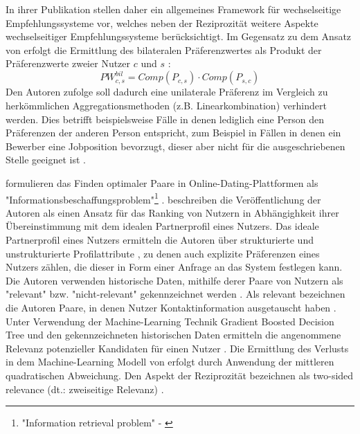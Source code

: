 In ihrer Publikation stellen \textcite[S. 38]{li:inproceedings} daher ein allgemeines Framework für wechselseitige Empfehlungssysteme vor, welches neben der Reziprozität weitere Aspekte wechselseitiger Empfehlungssysteme berücksichtigt.
Im Gegensatz zu dem Ansatz von \textcite[S. 207ff.]{pizzato:2010} erfolgt die Ermittlung des bilateralen Präferenzwertes als Produkt der Präferenzwerte zweier Nutzer $c$ und $s$ \cite[S. 710]{kumari:article}:
\begin{equation}\label{eq40}
    PW_{c,s}^{bil} = Comp(P_{c,s}) \cdot Comp(P_{s,c})
\end{equation}
Den Autoren zufolge soll dadurch eine unilaterale Präferenz im Vergleich zu herkömmlichen Aggregationsmethoden (z.B. Linearkombination) verhindert werden.
Dies betrifft beispielsweise Fälle in denen lediglich eine Person den Präferenzen der anderen Person entspricht, zum Beispiel in Fällen in denen ein Bewerber eine Jobposition bevorzugt, dieser aber nicht für die ausgeschriebenen Stelle geeignet ist \cite[S. 38]{li:inproceedings}.

\textcite[S. 66ff.]{diaz:inproceedings} formulieren das Finden optimaler Paare in Online-Dating-Plattformen als "Informationsbeschaffungsproblem"\footnote{"Information retrieval problem" - \textcite[S. 67]{diaz:inproceedings}} \cite[S. 550]{koprinska:inbook}.
\textcite[S. 550]{koprinska:inbook} beschreiben die Veröffentlichung der Autoren als einen Ansatz für das Ranking von Nutzern in Abhängighkeit ihrer Übereinstimmung mit dem idealen Partnerprofil eines Nutzers.
Das ideale Partnerprofil eines Nutzers ermitteln die Autoren über strukturierte und unstrukturierte Profilattribute \cite[S. 288]{li:article}\cite[S. 272]{pizzato:2:inproceedings}, zu denen auch explizite Präferenzen eines Nutzers zählen, die dieser in Form einer Anfrage an das System festlegen kann.
Die Autoren verwenden historische Daten, mithilfe derer Paare von Nutzern als "relevant" bzw. "nicht-relevant" gekennzeichnet werden \cite[S. 288]{li:article}.
Als relevant bezeichnen die Autoren Paare, in denen Nutzer Kontaktinformation ausgetauscht haben \cite[S. 66ff.]{diaz:inproceedings}.
Unter Verwendung der Machine-Learning Technik Gradient Boosted Decision Tree und den gekennzeichneten historischen Daten ermitteln \textcite[S. 69]{diaz:inproceedings} die angenommene Relevanz potenzieller Kandidaten für einen Nutzer \cite[S. 550]{koprinska:inbook}.
Die Ermittlung des Verlusts in dem Machine-Learning Modell von \textcite[S. 69]{diaz:inproceedings} erfolgt durch Anwendung der mittleren quadratischen Abweichung.
Den Aspekt der Reziprozität bezeichnen \textcite[S. 66]{diaz:inproceedings} als two-sided relevance (dt.: zweiseitige Relevanz) \cite[S. 550]{koprinska:inbook}.

